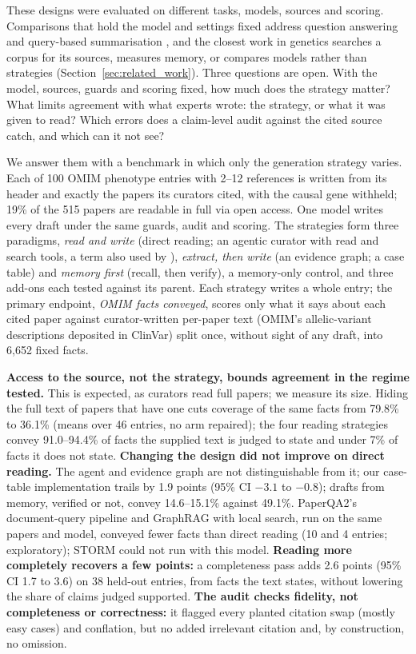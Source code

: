 \documentclass{article} %
\begin{document}
These designs were evaluated on different tasks, models, sources and scoring. Comparisons that hold the model and settings fixed address question answering and query-based summarisation \citep{li2024retrieval,Li2025LaraBenchmarking,han2025rag}, and the closest work in genetics searches a corpus for its sources, measures memory, or compares models rather than strategies (Section~\ref{sec:related_work}). Three questions are open. With the model, sources, guards and scoring fixed, how much does the strategy matter? What limits agreement with what experts wrote: the strategy, or what it was given to read? Which errors does a claim-level audit against the cited source catch, and which can it not see?

We answer them with a benchmark in which only the generation strategy varies. Each of 100 OMIM phenotype entries with 2--12 references is written from its header and exactly the papers its curators cited, with the causal gene withheld; 19\% of the 515 papers are readable in full via open access. One model writes every draft under the same guards, audit and scoring. The strategies form three paradigms, \emph{read and write} (direct reading; an agentic curator with read and search tools, a term also used by \citet{balhoff2026frontier}), \emph{extract, then write} (an evidence graph; a case table) and \emph{memory first} (recall, then verify), a memory-only control, and three add-ons each tested against its parent. Each strategy writes a whole entry; the primary endpoint, \emph{OMIM facts conveyed}, scores only what it says about each cited paper against curator-written per-paper text (OMIM's allelic-variant descriptions deposited in ClinVar) split once, without sight of any draft, into 6,652 fixed facts.

\textbf{Access to the source, not the strategy, bounds agreement in the regime tested.} This is expected, as curators read full papers; we measure its size. Hiding the full text of papers that have one cuts coverage of the same facts from 79.8\% to 36.1\% (means over 46 entries, no arm repaired); the four reading strategies convey 91.0--94.4\% of facts the supplied text is judged to state and under 7\% of facts it does not state. \textbf{Changing the design did not improve on direct reading.} The agent and evidence graph are not distinguishable from it; our case-table implementation trails by 1.9 points (95\% CI $-3.1$ to $-0.8$); drafts from memory, verified or not, convey 14.6--15.1\% against 49.1\%. PaperQA2's document-query pipeline and GraphRAG with local search, run on the same papers and model, conveyed fewer facts than direct reading (10 and 4 entries; exploratory); STORM could not run with this model. \textbf{Reading more completely recovers a few points:} a completeness pass adds 2.6 points (95\% CI 1.7 to 3.6) on 38 held-out entries, from facts the text states, without lowering the share of claims judged supported. \textbf{The audit checks fidelity, not completeness or correctness:} it flagged every planted citation swap (mostly easy cases) and conflation, but no added irrelevant citation and, by construction, no omission.
\end{document}
